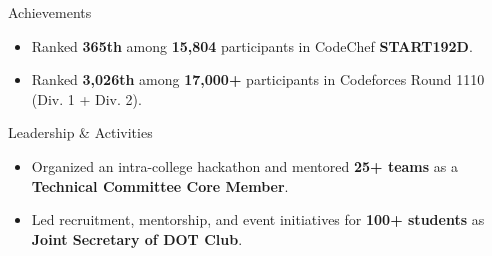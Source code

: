 \documentclass{resume}
\begin{document}
\begin{achievementSection}{Achievements}
    \begin{itemize}
        \itemsep -6pt {}
        \item Ranked \textbf{365th} among \textbf{15,804} participants in CodeChef \textbf{START192D}.
        \item Ranked \textbf{3,026th} among \textbf{17,000+} participants in Codeforces Round 1110 (Div. 1 + Div. 2).
    \end{itemize}
\end{achievementSection}


\begin{experienceSection}{Leadership \& Activities}

    \begin{itemize}
        \itemsep -6pt {}

        \item Organized an intra-college hackathon and mentored \textbf{25+ teams} as a \textbf{Technical Committee Core Member}.

        \item Led recruitment, mentorship, and event initiatives for \textbf{100+ students} as \textbf{Joint Secretary of DOT Club}.

    \end{itemize}

\end{experienceSection}
\end{document}
